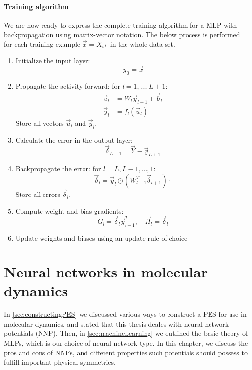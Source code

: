 \documentclass[twoside,english]{uiofysmaster}
\begin{document}
\subsubsection{Training algorithm}
We are now ready to express the complete training algorithm for a MLP with backpropagation using
matrix-vector notation. The below process is performed for each training example $\vec{x} = X_{i*}$ in the whole
data set.
\begin{enumerate}
 \item Initialize the input layer:
 \begin{equation}
  \vec{y}_0 = \vec{x}
 \end{equation}
 \item Propagate the activity forward: for $l = 1,\dots,L+1$:
 \begin{equation}
 \begin{aligned}
  \vec{u}_l &= W_l\vec{y}_{l-1} + \vec{b}_l \\
  \vec{y}_l &= f_l(\vec{u}_l)
  \label{forwardPropMatrix}
 \end{aligned}
 \end{equation}
 Store all vectors $\vec{u}_l$ and $\vec{y}_l$.
 \item Calculate the error in the output layer:
 \begin{equation}
  \vec{\delta}_{L+1} = \vec{Y} - \vec{y}_{L+1}
 \end{equation}
 \item Backpropagate the error: for $l = L, L-1, \dots ,1$:
 \begin{equation}
 \vec{\delta}_l = \vec{y}^\prime_l \odot (W^T_{l+1}\vec{\delta}_{l+1}) \cdot 
 \label{backPropMatrix}
 \end{equation}
 Store all errors $\vec{\delta}_l$. 
 \item Compute weight and bias gradients: 
 \begin{equation}
  G_l = \vec{\delta}_l \vec{y}_{l-1}^T, \quad \vec{H}_l = \vec{\delta}_l
  \label{weightUpdate}
 \end{equation}
 \item Update weights and biases using an update rule of choice
\end{enumerate}


\chapter{Neural networks in molecular dynamics} \label{sec:NNsAndMD}
In \autoref{sec:constructingPES} we discussed various ways to construct a PES for use in molecular dynamics, and
stated that this thesis deales with neural network potentials (NNP). Then, in \autoref{sec:machineLearning}
we outlined the basic theory of MLPs, which is our choice of neural network type. In this chapter, 
we discuss the pros and cons of NNPs, and different properties such potentials should possess to 
fulfill important physical symmetries. 
\end{document}
